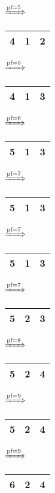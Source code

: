 \documentclass{article}
\begin{document}
\begin{itemize}
            $\xRightarrow{\text{pf}=5}$
            \begin{tabular}{|c|c|c|}
                \hline
                4 & 1 & 2\\
                \hline
            \end{tabular}
            $\xRightarrow{\text{pf}=5}$
            \begin{tabular}{|c|c|c|}
                \hline
                4 & 1 & 3\\
                \hline
            \end{tabular}
            $\xRightarrow{\text{pf}=6}$
            \begin{tabular}{|c|c|c|}
                \hline
                5 & 1 & 3\\
                \hline
            \end{tabular}
            $\xRightarrow{\text{pf}=7}$
            \begin{tabular}{|c|c|c|}
                \hline
                5 & 1 & 3\\
                \hline
            \end{tabular}
            $\xRightarrow{\text{pf}=7}$
            \begin{tabular}{|c|c|c|}
                \hline
                5 & 1 & 3\\
                \hline
            \end{tabular}
            $\xRightarrow{\text{pf}=7}$
            \begin{tabular}{|c|c|c|}
                \hline
                5 & 2 & 3\\
                \hline
            \end{tabular}
            $\xRightarrow{\text{pf}=8}$
            \begin{tabular}{|c|c|c|}
                \hline
                5 & 2 & 4\\
                \hline
            \end{tabular}
            $\xRightarrow{\text{pf}=9}$
            \begin{tabular}{|c|c|c|}
                \hline
                5 & 2 & 4\\
                \hline
            \end{tabular}
            $\xRightarrow{\text{pf}=9}$
            \begin{tabular}{|c|c|c|}
                \hline
                6 & 2 & 4\\
                \hline

\end{tabular}
\end{itemize}
\end{document}
